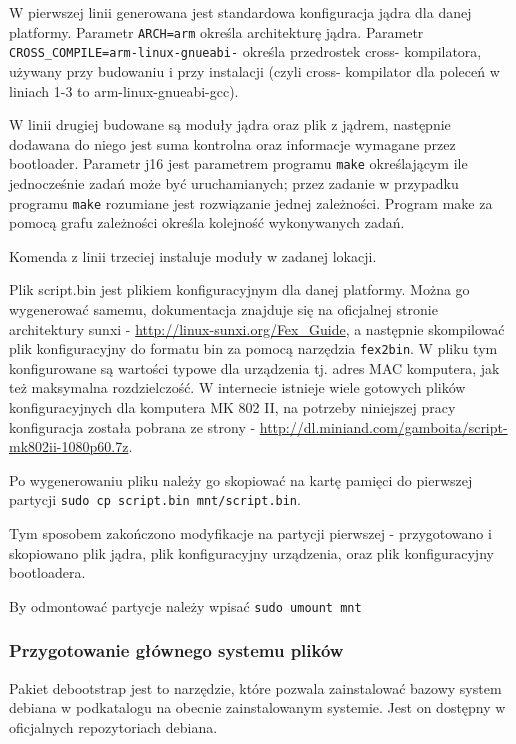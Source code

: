 W pierwszej linii generowana jest standardowa konfiguracja jądra dla danej platformy. Parametr \lstinline{ARCH=arm} określa architekturę jądra. Parametr \lstinline{CROSS_COMPILE=arm-linux-gnueabi-} określa przedrostek cross- kompilatora, używany przy budowaniu i przy instalacji (czyli cross- kompilator dla poleceń w liniach 1-3 to arm-linux-gnueabi-gcc).

\par

W linii drugiej budowane są moduły jądra oraz plik z jądrem, następnie dodawana do niego jest suma kontrolna oraz informacje wymagane przez bootloader. Parametr j16 jest parametrem programu \lstinline{make} określającym ile jednocześnie zadań może być uruchamianych; przez zadanie w przypadku programu \lstinline{make} rozumiane jest rozwiązanie jednej zależności. Program make za pomocą grafu zależności określa kolejność wykonywanych zadań.

\par
Komenda z linii trzeciej instaluje moduły w zadanej lokacji.
\par
Plik script.bin jest plikiem konfiguracyjnym dla danej platformy. Można go wygenerować samemu, dokumentacja znajduje się na oficjalnej stronie architektury sunxi - \url{http://linux-sunxi.org/Fex_Guide}, a następnie skompilować plik konfiguracyjny do formatu bin za pomocą narzędzia \lstinline{fex2bin}. W pliku tym konfigurowane są wartości typowe dla urządzenia tj. adres MAC komputera, jak też maksymalna rozdzielczość.  W internecie istnieje wiele gotowych plików konfiguracyjnych dla komputera MK 802 II, na potrzeby niniejszej pracy konfiguracja została pobrana ze strony - \url{http://dl.miniand.com/gamboita/script-mk802ii-1080p60.7z}. 

Po wygenerowaniu pliku należy go skopiować na kartę pamięci do pierwszej partycji \lstinline{sudo cp script.bin mnt/script.bin}. 

Tym sposobem zakończono modyfikacje na partycji pierwszej - przygotowano i skopiowano plik jądra, plik konfiguracyjny urządzenia, oraz plik konfiguracyjny bootloadera. 

By odmontować partycje należy wpisać \lstinline{sudo umount mnt}

\subsubsection{Przygotowanie głównego systemu plików}

Pakiet debootstrap jest to narzędzie, które pozwala zainstalować bazowy system debiana w podkatalogu na obecnie zainstalowanym systemie. Jest on dostępny w oficjalnych repozytoriach debiana.

